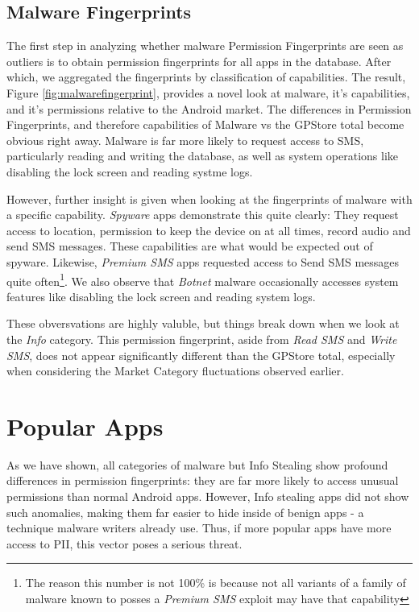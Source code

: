 \subsection{Malware Fingerprints}
The first step in analyzing whether malware Permission Fingerprints are seen as outliers is to obtain permission fingerprints for all apps in the database. After which, we aggregated the fingerprints by classification of capabilities. The result, Figure \ref{fig:malwarefingerprint}, provides a novel look at malware, it's capabilities, and it's permissions relative to the Android market. The differences in Permission Fingerprints, and therefore capabilities of Malware vs the GPStore total become obvious right away. Malware is far more likely to request access to SMS, particularly reading and writing the database, as well as system operations like disabling the lock screen and reading systme logs. 

However, further insight is given when looking at the fingerprints of malware with a specific capability. \textit{Spyware} apps demonstrate this quite clearly: They request access to location, permission to keep the device on at all times, record audio and send SMS messages. These capabilities are what would be expected out of spyware. Likewise, \textit{Premium SMS} apps requested access to Send SMS messages quite often\footnote{The reason this number is not 100\% is because not all variants of a family of malware known to posses a \textit{Premium SMS} exploit may have that capability}. We also observe that \textit{Botnet} malware occasionally accesses system features like disabling the lock screen and reading system logs.

These obversvations are highly valuble, but things break down when we look at the \textit{Info} category. This permission fingerprint, aside from \textit{Read SMS} and \textit{Write SMS}, does not appear significantly different than the GPStore total, especially when considering the Market Category fluctuations observed earlier. 


\section{Popular Apps}
As we have shown, all categories of malware but Info Stealing show profound differences in permission fingerprints: they are far more likely to access unusual permissions than normal Android apps. However, Info stealing apps did not show such anomalies, making them far easier to hide inside of benign apps - a technique malware writers already use\citep{avastfakeapps}. Thus, if more popular apps have more access to PII, this vector poses a serious threat.

